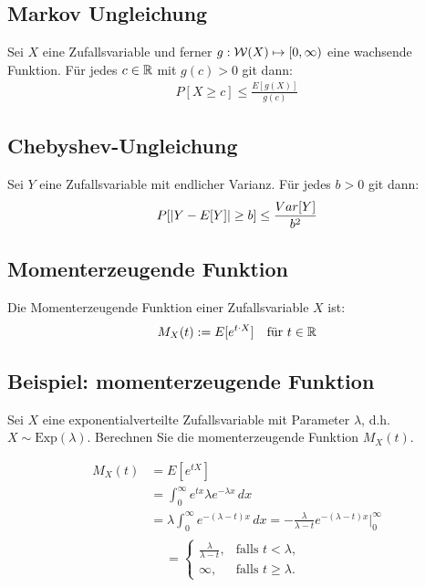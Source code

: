 \subsection*{Markov Ungleichung}
Sei $X$ eine Zufallsvariable und ferner $g : \mathcal{W} (X) \mapsto [0, \infty)$ eine
wachsende Funktion. Für jedes $c \in \mathbb{R}$ mit $g (c) > 0$ git dann:
\begin{align*}
  P[X \geq c] \leq \frac{E[g (X)]}{g (c)}
\end{align*}
\subsection*{Chebyshev-Ungleichung}
Sei $Y$ eine Zufallsvariable mit endlicher Varianz. Für jedes $b > 0$ git dann:
\begin{align*}
  P[\abs{Y - E[Y]} \geq b] \leq \frac{Var[Y]}{b^2}
\end{align*}
\subsection*{Momenterzeugende Funktion}
Die Momenterzeugende Funktion einer Zufallsvariable $X$ ist:
\begin{align*}
  M_X (t) := E[e^{t \cdot X}] &  & \text{für } t \in \mathbb{R}
\end{align*}

\BoxStart{}
\subsection*{Beispiel: momenterzeugende Funktion}
Sei \(X\) eine exponentialverteilte Zufallsvariable mit Parameter \(\lambda\), d.h. \(X \sim \text{Exp}(\lambda)\). Berechnen Sie die momenterzeugende Funktion \(M_X(t)\).

\begin{align*}
  M_X(t) &= E[e^{tX}] \\
         &= \int_{0}^{\infty} e^{tx} \lambda e^{-\lambda x} \, dx \\
         &= \lambda \int_{0}^{\infty} e^{-(\lambda - t)x} \, dx = -\frac{\lambda}{\lambda - t} e^{-(\lambda - t)x} \bigg|_{0}^{\infty} \\
         &\begin{aligned}
           &= \begin{cases}
                \frac{\lambda}{\lambda - t}, & \text{falls } t < \lambda, \\
                \infty, & \text{falls } t \geq \lambda.
              \end{cases}
           \end{aligned}
\end{align*}
\BoxEnd{}

